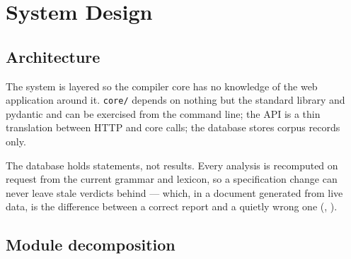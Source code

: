 \section{System Design}\label{c:sdd}

\subsection{Architecture}

The system is layered so the compiler core has no knowledge of the web application around
it. \texttt{core/} depends on nothing but the standard library and pydantic and can be
exercised from the command line; the API is a thin translation between HTTP and core
calls; the database stores corpus records only.


\begin{keypoint}
The database holds statements, not results. Every analysis is recomputed on request from
the current grammar and lexicon, so a specification change can never leave stale verdicts
behind --- which, in a document generated from live data, is the difference between a
correct report and a quietly wrong one (, ).
\end{keypoint}

\subsection{Module decomposition}


